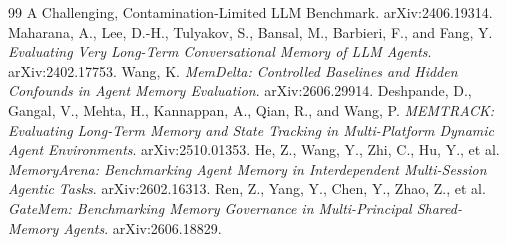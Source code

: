 \documentclass[11pt]{article}
\begin{document}
\begin{thebibliography}{99}
{A Challenging, Contamination-Limited LLM Benchmark}. arXiv:2406.19314.
 Maharana, A., Lee, D.-H., Tulyakov, S., Bansal, M., Barbieri,
F., and Fang, Y. \emph{Evaluating Very Long-Term Conversational Memory of LLM
Agents}. arXiv:2402.17753.
 Wang, K. \emph{MemDelta: Controlled Baselines and Hidden
Confounds in Agent Memory Evaluation}. arXiv:2606.29914.
 Deshpande, D., Gangal, V., Mehta, H., Kannappan, A., Qian,
R., and Wang, P. \emph{MEMTRACK: Evaluating Long-Term Memory and State Tracking
in Multi-Platform Dynamic Agent Environments}. arXiv:2510.01353.
 He, Z., Wang, Y., Zhi, C., Hu, Y., et al.
\emph{MemoryArena: Benchmarking Agent Memory in Interdependent Multi-Session
Agentic Tasks}. arXiv:2602.16313.
 Ren, Z., Yang, Y., Chen, Y., Zhao, Z., et al. \emph{GateMem:
Benchmarking Memory Governance in Multi-Principal Shared-Memory Agents}.
arXiv:2606.18829.
\end{thebibliography}
\end{document}
